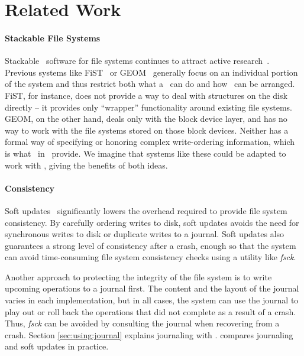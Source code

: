 \section{Related Work}
\label{sec:related}

\paragraph{Stackable File Systems}


Stackable \module\ software for file systems continues to attract active
research~\cite{rosenthal90evolving, heidemann91layered, skinner93stacking,
heidemann94filesystem,zadok99extending,
zadok00fist,wright03ncryptfs,wright06versatility}. Previous
systems like FiST~\cite{zadok00fist} or GEOM~\cite{geom} generally focus on
an individual portion of the system and thus restrict both what a \module\
can do and how \modules\ can be arranged. FiST, for instance, does not
provide a way to deal with structures on the disk directly -- it provides
only ``wrapper'' functionality around existing file
systems. %
GEOM, on the other hand, deals only with the block device layer, and has no
way to work with the file systems stored on those block devices. Neither
has a formal way of specifying or honoring complex write-ordering
information, which is what \chdescs\ in \Kudos\ provide. We imagine that
systems like these could be adapted to work with \chdescs, giving the
benefits of both ideas.

\paragraph{Consistency}

Soft updates~\cite{ganger00soft} 
significantly lowers the overhead required to provide file system
consistency. By carefully ordering writes to disk, soft updates avoids the need
for synchronous writes to disk or duplicate writes to a journal. Soft updates
also guarantees a strong level of consistency after a crash, enough so that the
system can avoid time-consuming file system consistency checks using a utility
like \emph{fsck}. 


Another approach to protecting the integrity of the file system is to write
upcoming operations to a journal first. The content and the layout of the
journal varies in each implementation, but in all cases, the system can use
the journal to play out or roll back the operations that did not complete
as a result of a crash. Thus, \emph{fsck} can be avoided by consulting the
journal when recovering from a crash. Section \ref{sec:using:journal}
explains journaling with \chdescs. \cite{seltzer00journaling} compares
journaling and soft updates in practice.

